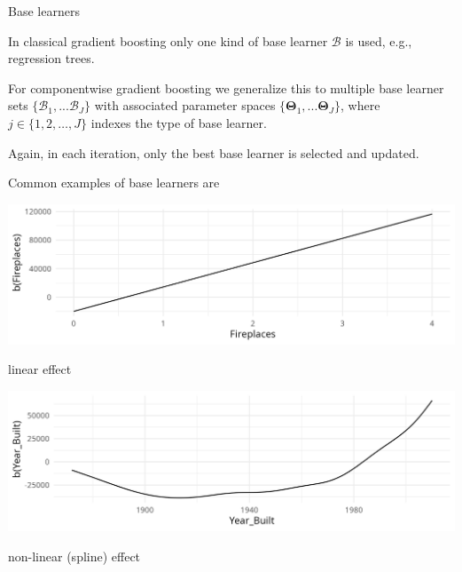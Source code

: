 
\begin{vbframe}{Base learners}

In classical gradient boosting only one kind of base learner $\mathcal{B}$ is used, e.g.,
regression trees.

\lz

For componentwise gradient boosting we generalize this to multiple base learner sets $\{ \mathcal{B}_1, ... \mathcal{B}_J \}$ with associated parameter spaces
$\{ \bm{\Theta}_1, ... \bm{\Theta}_J \}$,
%
 where $j \in \{ 1, 2, \dots, J \}$ indexes the type of base learner.
%
\lz

Again, in each iteration, only the best base learner
is selected and updated.

\framebreak

Common examples of base learners are

\begin{minipage}{0.4\textwidth}
    \includegraphics[width=\linewidth]{figure/compboost-base-learner-linear.png}
\end{minipage}\hfill
\begin{minipage}{0.5\textwidth}
  linear effect
\end{minipage}

\begin{minipage}{0.4\textwidth}
    \includegraphics[width=\linewidth]{figure/compboost-base-learner-spline.png}
\end{minipage}\hfill
\begin{minipage}{0.5\textwidth}
  non-linear (spline) effect
\end{minipage}


\end{vbframe}
